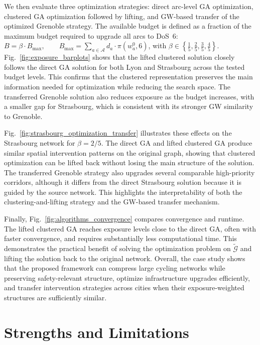 \documentclass[lettersize,journal]{IEEEtran}
\begin{document}
We then evaluate three optimization strategies: direct arc-level GA optimization,
clustered GA optimization followed by lifting, and GW-based transfer of the
optimized Grenoble strategy. The available budget is defined as a fraction of
the maximum budget required to upgrade all arcs to DoS~$6$:$
B=\beta \cdot B_{\max},
\qquad
B_{\max}
=
\sum_{a\in\mathcal{A}}
d_a \cdot \pi(w_a^0,6)$,
with $
\beta\in\left\{\frac{1}{5},\frac{2}{5},\frac{3}{5},\frac{4}{5}\right\}$.
Fig.~\ref{fig:exposure_barplots} shows that the lifted clustered solution
closely follows the direct GA solution for both Lyon and Strasbourg across the
tested budget levels. This confirms that the clustered representation preserves
the main information needed for optimization while reducing the search space.
The transferred Grenoble solution also reduces exposure as the budget increases,
with a smaller gap for Strasbourg, which is consistent with its stronger GW
similarity to Grenoble.

Fig.~\ref{fig:strasbourg_optimization_transfer} illustrates these effects on
the Strasbourg network for $\beta=2/5$. The direct GA and lifted clustered GA
produce similar spatial intervention patterns on the original graph, showing
that clustered optimization can be lifted back without losing the main structure
of the solution. The transferred Grenoble strategy also upgrades several
comparable high-priority corridors, although it differs from the direct
Strasbourg solution because it is guided by the source network. This highlights
the interpretability of both the clustering-and-lifting strategy and the
GW-based transfer mechanism.

Finally, Fig.~\ref{fig:algorithms_convergence} compares convergence and
runtime. The lifted clustered GA reaches exposure levels close to the direct GA,
often with faster convergence, and requires substantially less computational
time. This demonstrates the practical benefit of solving the optimization problem
on $\tilde{\mathcal{G}}$ and lifting the solution back to the original network.
Overall, the case study shows that the proposed framework can compress large
cycling networks while preserving safety-relevant structure, optimize
infrastructure upgrades efficiently, and transfer intervention strategies across
cities when their exposure-weighted structures are sufficiently similar.

\section{Strengths and Limitations}
\label{sec:strengths_limitations}
\end{document}
